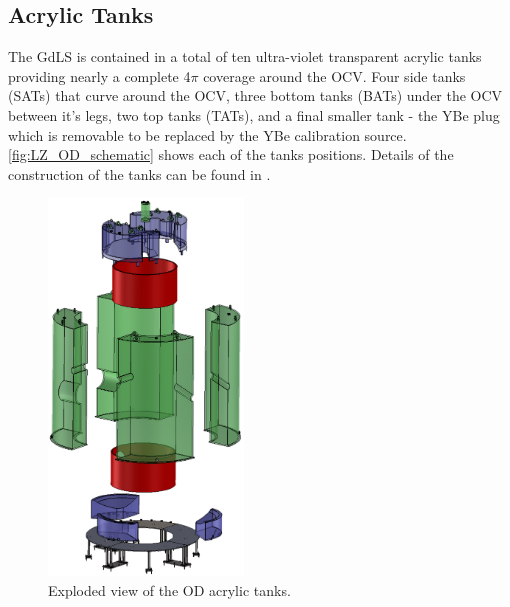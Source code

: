 \subsection{Acrylic Tanks}
\par
The GdLS is contained in a total of ten ultra-violet transparent acrylic tanks providing nearly a complete 4$\pi$ coverage around the OCV.
Four side tanks (SATs) that curve around the OCV, three bottom tanks (BATs) under the OCV between it's legs, two top tanks (TATs), and a final smaller tank - the YBe plug which is removable to be replaced by the YBe calibration source.
\autoref{fig:LZ_OD_schematic} shows each of the tanks positions.
Details of the construction of the tanks can be found in \cite{scotthaselschwardt_thesis_ref}.
\begin{figure}
    \centering
    \includegraphics[height=10cm]{Figures/LZ/OD_Tanks_CAD.png}
    \caption{Exploded view of the OD acrylic tanks.}
    \label{fig:LZ_OD_Tanks}
\end{figure}


